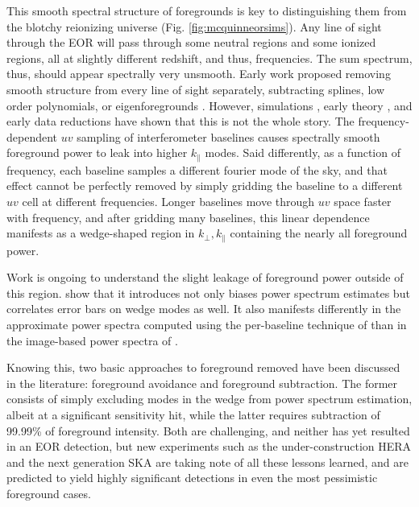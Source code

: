 This smooth spectral structure of foregrounds is key to distinguishing them from the blotchy reionizing universe (Fig. \ref{fig:mcquinneorsims}). Any line of sight through the EOR will pass through some neutral regions and some ionized regions, all at slightly different redshift, and thus, frequencies. The sum spectrum, thus, should appear spectrally very unsmooth. Early work proposed removing smooth structure from every line of sight separately, subtracting splines, low order polynomials, or eigenforegrounds \citep{Judd08, paper1, paper2,xiaomin,LOFAR2,Harker,Jelic08,MoralesBowmanHewittFGsub}. However, simulations \citep{Dattapowerspec}, early theory \citep{VedanthamWedge,MoralesPSShapes,CathWedge,nithya13}, and early data reductions have shown that this is not the whole story. The frequency-dependent $uv$ sampling of interferometer baselines causes spectrally smooth foreground power to leak into higher $k_\parallel$ modes. Said differently, as a function of frequency, each baseline samples a different fourier mode of the sky, and that effect cannot be perfectly removed by simply gridding the baseline to a different $uv$ cell at different frequencies. Longer baselines move through $uv$ space faster with frequency, and after gridding many baselines, this linear dependence manifests as a wedge-shaped region in  $k_\perp,k_\parallel$ containing the nearly all foreground power. 

Work is ongoing to understand the slight leakage of foreground power outside of this region. \citet{AdrianWedge1,AdrianWedge2} show that it introduces not only biases power spectrum estimates but correlates error bars on wedge modes as well. It also manifests differently \citep{pober13} in the approximate power spectra computed using the per-baseline technique of \citet{parsonsandbacker,parsons12b} than in the image-based power spectra of \citep{beardsley16,dillonneben,X13}. 

Knowing this, two basic approaches to foreground removed have been discussed in the literature: foreground avoidance and foreground subtraction. The former consists of simply excluding modes in the wedge from power spectrum estimation, albeit at a significant sensitivity hit, while the latter requires subtraction of 99.99\% of foreground intensity. Both are challenging, and neither has yet resulted in an EOR detection, but new experiments such as the under-construction HERA \citep{neben16,ewallwice16,nithya16,deboer16,patra16} and the next generation SKA \citep{ska,ska1,ska2,ska3} are taking note of all these lessons learned, and are predicted to yield highly significant detections in even the most pessimistic foreground cases. 

